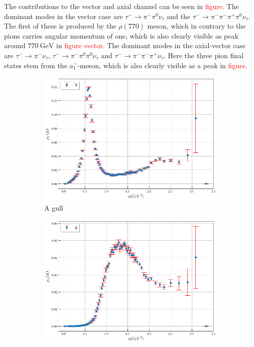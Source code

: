 \documentclass[../../index.tex]{subfiles}
\begin{document}
The contributions to the vector and axial channel can be seen in
\textcolor{red}{figure}. The dominant modes in the vector case are
\cite{Davier2006} $\tau^- \to \pi^-\pi^0 \nu_\tau$ and the $\tau^- \to \pi^-
\pi^- \pi^+ \pi^0 \nu_\tau$. The first of these is produced by the $\rho(770)$
meson, which in contrary to the pions carries angular momentum of one, which is
also clearly visible as peak around $\SI{770}{\giga\eV}$ in
\textcolor{red}{figure vector}. The dominant modes in the axial-vector case are
$\tau^-\to \pi^-\nu_\tau$, $\tau^-\to \pi^- \pi^0 \pi^0 \nu_\tau$ and
$\tau^- \to \pi^- \pi^- \pi^+\nu_\tau$. Here the three pion final states stem
from the $a_1^-$-meson, which is also clearly visible as a peak in \textcolor{red}{figure}.
\begin{figure}
    \centering
    \begin{subfigure}[b]{0.49\textwidth}
        \includegraphics[width=\textwidth]{./images/specFuncAleph_V.png}
        \caption{A gull}
        \label{fig:gull}
    \end{subfigure}
    \begin{subfigure}[b]{0.49\textwidth}
        \includegraphics[width=\textwidth]{./images/specFuncAleph_A.png}

\end{subfigure}
\end{figure}
\end{document}
